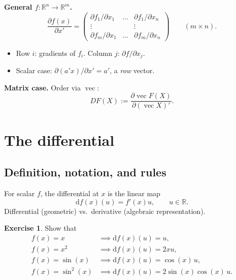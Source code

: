 \documentclass[14pt]{extarticle}
\theoremstyle{plain}
\theoremstyle{definition}
\newtheorem{exercise}{Exercise}
\theoremstyle{remark}
\DeclareMathOperator{\avec}{vec}
\newcommand{\dd}{\mathrm{d}}
\begin{document}
\textbf{General $f:\mathbb{R}^n \to \mathbb{R}^m$.}
\begin{equation}\label{eq:8}
\frac{\partial f(x)}{\partial x'} = \begin{pmatrix}
\partial f_1/\partial x_1 & \dots & \partial f_1/\partial x_n \\
\vdots & & \vdots \\
\partial f_m/\partial x_1 & \dots & \partial f_m/\partial x_n
\end{pmatrix} \qquad (m \times n).
\end{equation}
\begin{itemize}\setlength\itemsep{0pt}
\item Row $i$: gradients of $f_i$. Column $j$: $\partial f/\partial x_j$.
\item Scalar case: $\partial (a'x)/\partial x' = a'$, a \emph{row} vector.
\end{itemize}

\textbf{Matrix case.} Order via $\avec$:
\begin{equation}\label{eq:9}
DF(X) := \frac{\partial \avec F(X)}{\partial(\avec X)'}.
\end{equation}

\section{The differential}\label{sec:4}

\subsection{Definition, notation, and rules}\label{sec:4.1}

For scalar $f$, the differential at $x$ is the linear map
\begin{equation}\label{eq:10}
\dd f(x)(u) = f'(x) u, \qquad u \in \mathbb{R}.
\end{equation}
Differential (geometric) vs.\ derivative (algebraic representation).

\begin{exercise}\label{exer:6}
Show that
\begin{align*}
f(x) = x &\implies \dd f(x)(u) = u, \\
f(x) = x^2 &\implies \dd f(x)(u) = 2xu, \\
f(x) = \sin(x) &\implies \dd f(x)(u) = \cos(x)\, u, \\
f(x) = \sin^2(x) &\implies \dd f(x)(u) = 2\sin(x)\cos(x)\, u.
\end{align*}
\end{exercise}
\end{document}
